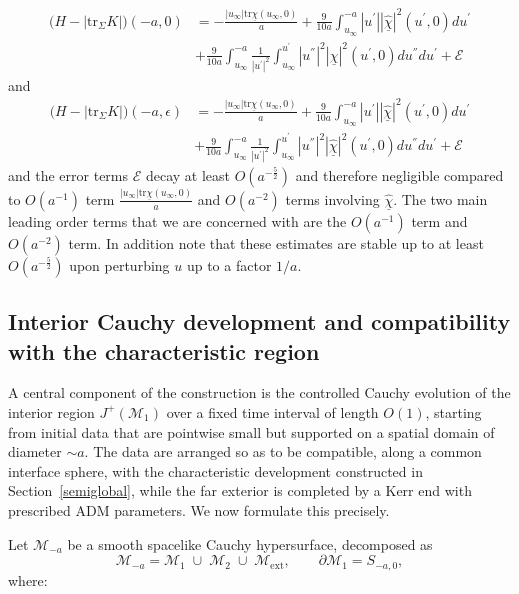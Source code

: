 \documentclass{amsart}
\newcommand{\chibar}{\underline{\chi}}
\newcommand{\chibarhat}{\underline{\hat{\chi}}}
\newcommand{\tr}{\mbox{tr}}
\begin{document}
\begin{align}
\bigg(H-|\tr_{\Sigma}K|\bigg)(-a,0)&=-\frac{|u_{\infty}|\tr\chibar(u_{\infty},0)}{a}+\frac{9}{10a}\int_{u_{\infty}}^{-a}|u^{'}||\chibarhat|^{2}(u^{'},0)du^{'}\\&+\frac{9}{10a}\int_{u_{\infty}}^{-a}\frac{1}{|u^{'}|^{2}}\int_{u_{\infty}}^{u^{'}}|u^{''}|^{2}|\chibarhat|^{2}(u^{'},0)du^{''}du^{'}+\mathscr{E}
\end{align}
and 
\begin{align}
\bigg(H-|\tr_{\Sigma}K|\bigg)(-a,\epsilon)&=-\frac{|u_{\infty}|\tr\chibar(u_{\infty},0)}{a}+\frac{9}{10a}\int_{u_{\infty}}^{-a}|u^{'}||\chibarhat|^{2}(u^{'},0)du^{'}\\\nonumber
&+\frac{9}{10a}\int_{u_{\infty}}^{-a}\frac{1}{|u^{'}|^{2}}\int_{u_{\infty}}^{u^{'}}|u^{''}|^{2}|\chibarhat|^{2}(u^{'},0)du^{''}du^{'}+\mathscr{E}    
\end{align}
and the error terms $\mathscr{E}$ decay at least $O(a^{-\frac{5}{2}})$ and therefore negligible compared to $O(a^{-1})$ term $\frac{|u_{\infty}|\tr\chibar(u_{\infty},0)}{a}$ and $O(a^{-2})$ terms involving $\chibarhat$. The two main leading order terms that we are concerned with are the $O(a^{-1})$ term and $O(a^{-2})$ term. In addition note that these estimates are stable up to at least $O(a^{-\frac{5}{2}})$ upon perturbing $u$ up to a factor $1/a$.   


\subsection{Interior Cauchy development and compatibility with the characteristic region}

A central component of the construction is the controlled Cauchy evolution of the interior region
$J^{+}(\mathcal M_{1})$ over a fixed time interval of length $O(1)$, starting from initial data that are
pointwise small but supported on a spatial domain of diameter $\sim a$. The data are arranged so as to be
compatible, along a common interface sphere, with the characteristic development constructed in
Section~\ref{semiglobal}, while the far exterior is completed by a Kerr end with prescribed ADM parameters.
We now formulate this precisely.

\medskip

\noindent Let $\mathcal M_{-a}$ be a smooth spacelike Cauchy hypersurface, decomposed as
\[
\mathcal M_{-a}
=
\mathcal M_{1}\;\cup\;\mathcal M_{2}\;\cup\;\mathcal M_{\mathrm{ext}},
\qquad
\partial \mathcal M_{1}=S_{-a,0},
\]
where:
\end{document}
